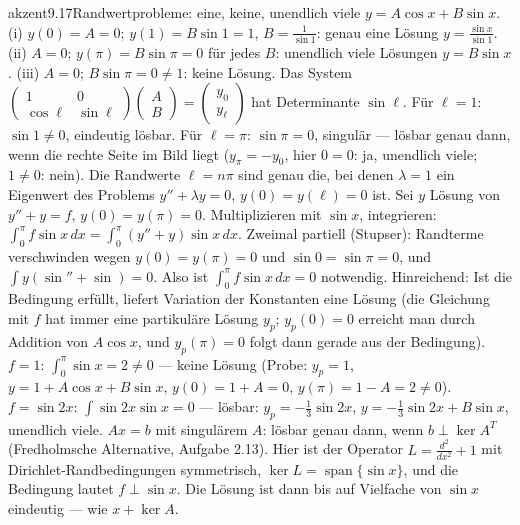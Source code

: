 \begin{loesungkarte}{akzent}{9.17}{Randwertprobleme: eine, keine, unendlich viele}
$y = A\cos x + B\sin x$. (i) $y(0) = A = 0$; $y(1) = B\sin1 = 1$, $B = \frac1{\sin1}$: genau eine Lösung $y = \frac{\sin x}{\sin1}$. (ii) $A = 0$; $y(\pi) = B\sin\pi = 0$ für jedes $B$: unendlich viele Lösungen $y = B\sin x$. (iii) $A = 0$; $B\sin\pi = 0\neq1$: keine Lösung.
Das System $\begin{pmatrix}1&0\\\cos\ell&\sin\ell\end{pmatrix}\begin{pmatrix}A\\B\end{pmatrix} = \begin{pmatrix}y_0\\y_\ell\end{pmatrix}$ hat Determinante $\sin\ell$. Für $\ell = 1$: $\sin1\neq0$, eindeutig lösbar. Für $\ell = \pi$: $\sin\pi = 0$, singulär --- lösbar genau dann, wenn die rechte Seite im Bild liegt ($y_\pi = -y_0$, hier $0 = 0$: ja, unendlich viele; $1\neq0$: nein). Die Randwerte $\ell = n\pi$ sind genau die, bei denen $\lambda = 1$ ein Eigenwert des Problems $y'' + \lambda y = 0$, $y(0) = y(\ell) = 0$ ist.
Sei $y$ Lösung von $y'' + y = f$, $y(0) = y(\pi) = 0$. Multiplizieren mit $\sin x$, integrieren: $\int_0^{\pi}f\sin x\,dx = \int_0^{\pi}(y'' + y)\sin x\,dx$. Zweimal partiell (Stupser): Randterme verschwinden wegen $y(0) = y(\pi) = 0$ und $\sin0 = \sin\pi = 0$, und $\int y(\sin'' + \sin) = 0$. Also ist $\int_0^{\pi}f\sin x\,dx = 0$ notwendig. Hinreichend: Ist die Bedingung erfüllt, liefert Variation der Konstanten eine Lösung (die Gleichung mit $f$ hat immer eine partikuläre Lösung $y_p$; $y_p(0) = 0$ erreicht man durch Addition von $A\cos x$, und $y_p(\pi) = 0$ folgt dann gerade aus der Bedingung). $f = 1$: $\int_0^{\pi}\sin x = 2\neq0$ --- keine Lösung (Probe: $y_p = 1$, $y = 1 + A\cos x + B\sin x$, $y(0) = 1 + A = 0$, $y(\pi) = 1 - A = 2\neq0$). $f = \sin2x$: $\int\sin2x\sin x = 0$ --- lösbar: $y_p = -\frac13\sin2x$, $y = -\frac13\sin2x + B\sin x$, unendlich viele.
$Ax = b$ mit singulärem $A$: lösbar genau dann, wenn $b\perp\ker A^{T}$ (Fredholmsche Alternative, Aufgabe 2.13). Hier ist der Operator $L = \frac{d^{2}}{dx^{2}} + 1$ mit Dirichlet-Randbedingungen symmetrisch, $\ker L = \operatorname{span}\{\sin x\}$, und die Bedingung lautet $f\perp\sin x$. Die Lösung ist dann bis auf Vielfache von $\sin x$ eindeutig --- wie $x + \ker A$.

\end{loesungkarte}
